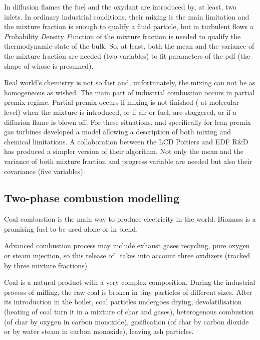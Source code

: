 In diffusion flames the fuel and the oxydant are introduced by, at least, two
inlets. In ordinary industrial conditions, their mixing is the main limitation
and the mixture fraction is enough to qualify a fluid particle, but in turbulent
flows a {\em P}robability {\em D}ensity {\em F}unction of the mixture fraction
is needed to qualify the thermodynamic state of the bulk. So, at least, both
the mean and the variance of the mixture fraction are needed (two variables) to
fit parameters of the pdf (the shape of whose is presumed).

Real world's chemistry is not so fast and, unfortunately, the mixing can not be
as homogeneous as wished. The main part of industrial combustion occurs in
partial premix regime. Partial premix occurs if mixing is not finished ( at
molecular level) when the mixture is introduced, or if air or fuel, are
staggered, or if a diffusion flame is blown off. For these situations, and
specifically for lean premix gas turbines \cite{Libby:2000a} developed a model allowing a
description of both mixing and chemical limitations. A collaboration between the
LCD Poitiers \cite{Ribert:2004a} and EDF R\&D has produced a simpler version of their
algorithm. Not only the mean and the variance of both mixture fraction and
progress variable are needed but also their covariance (five variables).


\subsection{Two-phase combustion modelling}

Coal combustion is the main way to produce electricity in the world.
Biomass is a promising fuel to be used alone or in blend.

Advanced combustion process may include exhaust gases recycling, pure oxygen or
steam injection, so this release of \CS ~takes into account
three oxidizers (tracked by three mixture fractions).

Coal is a natural product with a very complex composition. During the industrial
process of milling, the raw coal is broken in tiny particles of different
sizes. After its introduction in the boiler, coal particles undergoes drying,
devolatilisation (heating of coal turn it in a mixture of char and gases),
heterogenous combustion (of char by oxygen in carbon monoxide), gasification (of
char by carbon
dioxide or by water steam in carbon monoxide), leaving ash particles.

